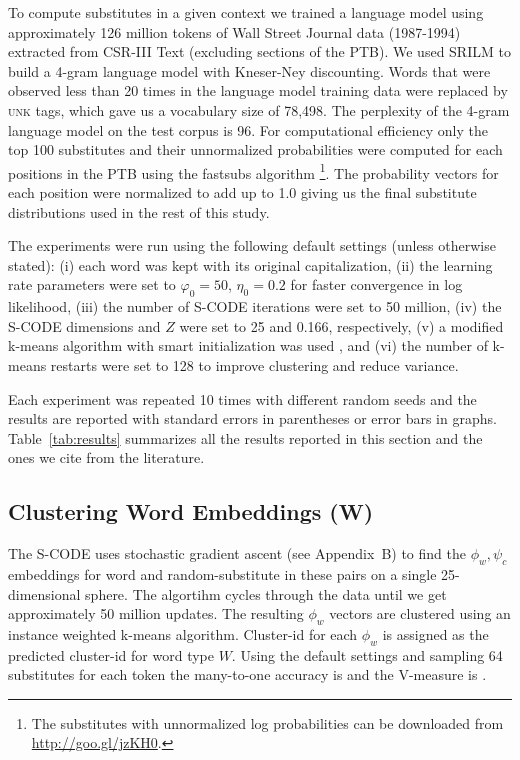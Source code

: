 To compute substitutes in a given context we trained a language model
using approximately 126 million tokens of Wall Street Journal data
(1987-1994) extracted from CSR-III Text \cite{csr3text} (excluding
sections of the PTB).
We used SRILM \cite{Stolcke2002} to build a 4-gram language model with
Kneser-Ney discounting.
Words that were observed less than 20 times in the language model
training data were replaced by \textsc{unk} tags, which gave us a
vocabulary size of 78,498.
The perplexity of the 4-gram language model on the test corpus is 96.
For computational efficiency only the top 100 substitutes and their
unnormalized probabilities were computed for each positions in the PTB
using the {\sc fastsubs} algorithm
\cite{yuret2012fastsub}\footnote{The substitutes with unnormalized log
  probabilities can be downloaded from
  \mbox{\url{http://goo.gl/jzKH0}}.}.  The probability vectors for
each position were normalized to add up to 1.0 giving us the final
substitute distributions used in the rest of this study.

The experiments were run using the following default settings (unless
otherwise stated): (i) each word was kept with its original
capitalization, (ii) the learning rate parameters were set to
$\varphi_0=50$, $\eta_0=0.2$ for faster convergence in log likelihood,
(iii) the number of S-CODE iterations were set to 50 million, (iv) the
S-CODE dimensions and $Z$ were set to 25 and 0.166, respectively, (v)
a modified k-means algorithm with smart initialization was used
\cite{arthur2007k}, and (vi) the number of k-means restarts were set
to 128 to improve clustering and reduce variance.

Each experiment was repeated 10 times with different random seeds and
the results are reported with standard errors in parentheses or error
bars in graphs.  Table~\ref{tab:results} summarizes all the results
reported in this section and the ones we cite from the literature.

\subsection{Clustering Word Embeddings ({\bf W})}
\label{sec:clustering-w}

The S-CODE uses stochastic gradient ascent (see Appendix~B) to find
the $\phi_w, \psi_c$ embeddings for word and random-substitute in
these pairs on a single 25-dimensional sphere.  The algortihm cycles
through the data until we get approximately 50 million updates.  The
resulting $\phi_w$ vectors are clustered using an instance weighted
k-means algorithm.  Cluster-id for each $\phi_w$ is assigned as the
predicted cluster-id for word type $W$.  Using the default settings
and sampling 64 substitutes for each token the many-to-one accuracy is
\wsmto and the V-measure is \wsvm.

